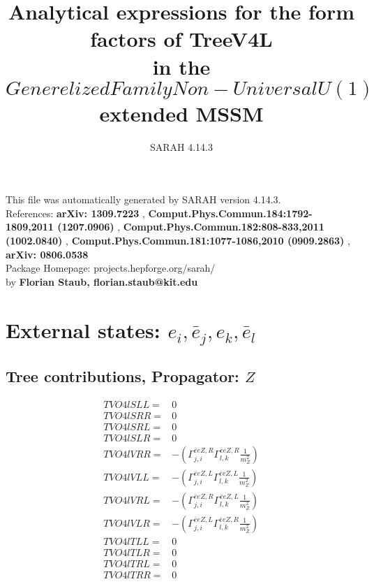 \documentclass[A4,landscape]{article}
\begin{document}
\title{Analytical expressions for the form factors of TreeV4L\\ in the $Generelized Family Non-Universal U(1)$ extended MSSM } 
 \author{SARAH 4.14.3} 
 \maketitle 
 \vspace{10cm} 
This file was automatically generated by SARAH version 4.14.3.  \\ 
References: {\bf arXiv: 1309.7223 }, {\bf Comput.Phys.Commun.184:1792-1809,2011 (1207.0906) }, {\bf Comput.Phys.Commun.182:808-833,2011 (1002.0840) }, {\bf Comput.Phys.Commun.181:1077-1086,2010 (0909.2863) }, {\bf arXiv: 0806.0538 } \\ 
Package Homepage: projects.hepforge.org/sarah/ \\ 
by {\bf Florian Staub, florian.staub@kit.edu} 
 \pagebreak 
 \tableofcontents 
 \pagebreak 
\section{External states: ${e_{{i}}, \bar{e}_{{j}}, e_{{k}}, \bar{e}_{{l}}}$} 
\subsection{Tree contributions, Propagator: $Z$} 

\begin{align} 
  TVO4lSLL= & 0 \\ 
  TVO4lSRR= & 0 \\ 
  TVO4lSRL= & 0 \\ 
  TVO4lSLR= & 0 \\ 
  TVO4lVRR= & -(\Gamma^{\bar{e}e Z ,R}_{j, i} \Gamma^{\bar{e}e Z ,R}_{l, k} \frac{1}{m^2_{Z}}) \\ 
  TVO4lVLL= & -(\Gamma^{\bar{e}e Z ,L}_{j, i} \Gamma^{\bar{e}e Z ,L}_{l, k} \frac{1}{m^2_{Z}}) \\ 
  TVO4lVRL= & -(\Gamma^{\bar{e}e Z ,R}_{j, i} \Gamma^{\bar{e}e Z ,L}_{l, k} \frac{1}{m^2_{Z}}) \\ 
  TVO4lVLR= & -(\Gamma^{\bar{e}e Z ,L}_{j, i} \Gamma^{\bar{e}e Z ,R}_{l, k} \frac{1}{m^2_{Z}}) \\ 
  TVO4lTLL= & 0 \\ 
  TVO4lTLR= & 0 \\ 
  TVO4lTRL= & 0 \\ 
  TVO4lTRR= & 0 \\ 
\end{align} 
\end{document}
